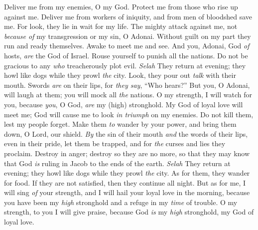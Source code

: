 \begin{biblechapter} %
 Deliver me from my enemies, O my God. 
Protect me from those who rise up against me.
\verse Deliver me from workers of iniquity, 
and from men of bloodshed save me.
\verse For look, they lie in wait for my life. 
The mighty attack against me, 
not \textit{because of} my transgression or my sin, O Adonai.
\verse Without guilt on my part they run and ready themselves. 
Awake to meet me and see.
\verse And you, Adonai, God \textit{of} hosts, \textit{are} the God of Israel. 
Rouse yourself to punish all the nations. 
Do not be gracious to any \textit{who} treacherously plot evil. \textit{Selah}
\verse They return at evening; they howl like dogs 
while they prowl \textit{the} city.
\verse Look, they pour out \textit{talk} with their mouth. 
Swords \textit{are} on their lips, 
for \textit{they say}, “Who hears?”
\verse But you, O Adonai, will laugh at them; 
you will mock all \textit{the} nations.
\verse O my strength, I will watch for you, 
because \textit{you}, O God, \textit{are} my (high) stronghold.
\verse My God of loyal love will meet me; 
God will cause me to look \textit{in triumph} on my enemies.
\verse Do not kill them, lest my people forget. 
Make them \textit{to} wander by your power, 
and bring them down, O Lord, our shield.
\verse \textit{By} the sin of their mouth \textit{and} the words of their lips, 
even in their pride, let them be trapped, 
and for \textit{the} curses and lies they proclaim.
\verse Destroy in anger; destroy so they are no more, 
so that they may know that God \textit{is} ruling in Jacob 
to the ends of the earth. \textit{Selah}
\verse They return at evening; they howl like dogs 
while they prowl \textit{the} city.
\verse As for them, they wander for food. 
If they are not satisfied, then they continue all night.
\verse But as for me, I will sing \textit{of} your strength, 
and I will hail your loyal love in the morning, 
because you have been my \textit{high} stronghold 
and a refuge in my \textit{time} of trouble.
\verse O my strength, to you I will give praise, 
because God \textit{is} my \textit{high} stronghold, 
my God of loyal love.
\end{biblechapter}

